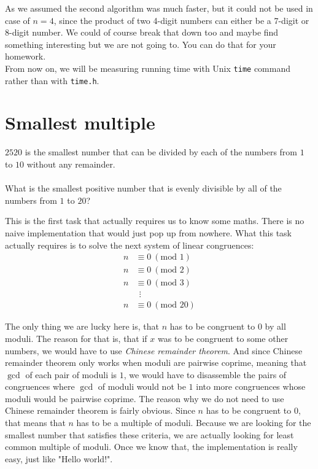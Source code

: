 \documentclass{book}
\renewcommand{\mod}{\textrm{mod }}
\newenvironment{task}
  {\begin{mdframed}[backgroundcolor=lightgray]}
  {\end{mdframed}}
\begin{document}
As we assumed the second algorithm was much faster, but it could not be used in case of $n = 4$, since the product of two 4-digit numbers can either be a 7-digit or 8-digit number. We could of course break that down too and maybe find something interesting but we are not going to. You can do that for your homework.\\

From now on, we will be measuring running time with Unix \texttt{time} command rather than with \texttt{time.h}.



\section{Smallest multiple}

\begin{task}
$2520$ is the smallest number that can be divided by each of the numbers from $1$ to $10$ without any remainder.\\
\\
What is the smallest positive number that is evenly divisible by all of the numbers from $1$ to $20$?
\end{task}

This is the first task that actually requires us to know some maths. There is no naive implementation that would just pop up from nowhere. What this task actually requires is to solve the next system of linear congruences:
\begin{align*}
n &\equiv 0~(\mod 1)\\
n &\equiv 0~(\mod 2)\\
n &\equiv 0~(\mod 3)\\
&~~\vdots\\
n &\equiv 0~(\mod 20)
\end{align*}

The only thing we are lucky here is, that $n$ has to be congruent to $0$ by all moduli. The reason for that is, that if $x$ was to be congruent to some other numbers, we would have to use \textit{Chinese remainder theorem}. And since Chinese remainder theorem only works when moduli are pairwise coprime, meaning that $\gcd$ of each pair of moduli is $1$, we would have to disassemble the pairs of congruences where $\gcd$ of moduli would not be $1$ into more congruences whose moduli would be pairwise coprime. The reason why we do not need to use Chinese remainder theorem is fairly obvious. Since $n$ has to be congruent to $0$, that means that $n$ has to be a multiple of moduli. Because we are looking for the smallest number that satisfies these criteria, we are actually looking for least common multiple of moduli. Once we know that, the implementation is really easy, just like "Hello world!".\\
\end{document}
